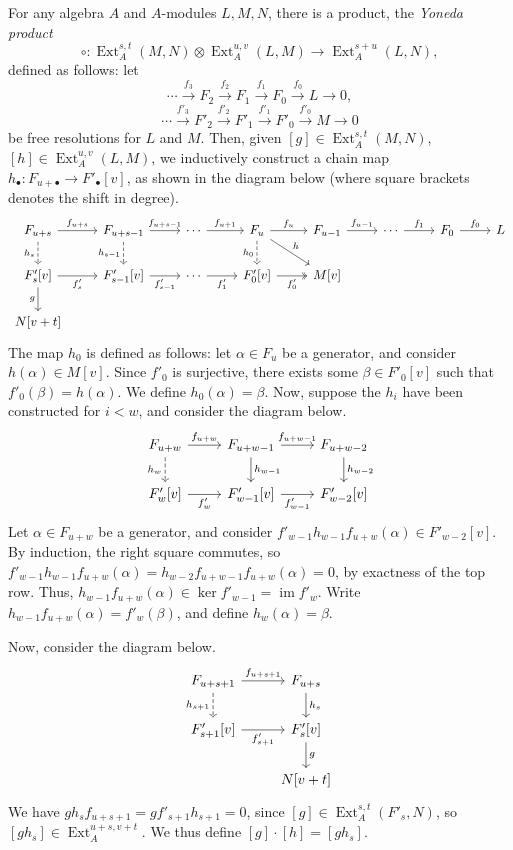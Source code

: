 \documentclass{MetricNotes2023}
\DeclareMathOperator{\Ext}{Ext}
\DeclareMathOperator{\im}{im}
\begin{document}
\begin{definition}
For any algebra \(A\) and \(A\)-modules \(L,M,N\), there is a product, the \textit{Yoneda product}
\[\circ : \Ext_A^{s,t}(M,N)\otimes \Ext^{u,v}_A(L,M)\to \Ext_A^{s+u}(L,N),\]
defined as follows: let 
\[\cdots \xrightarrow{f_3} F_2 \xrightarrow{f_2} F_1 \xrightarrow{f_1} F_0 \xrightarrow{f_0} L\to 0,\]
\[\cdots \xrightarrow{f'_3} F'_2 \xrightarrow{f'_2} F'_1 \xrightarrow{f'_1} F'_0 \xrightarrow{f'_0} M\to 0\]
be free resolutions for \(L\) and \(M\). Then, given \([g] \in \Ext_A^{s,t}(M, N)\), \([h]\in \Ext_A^{u,v}(L, M)\), we inductively construct a chain map \(h_\bullet : F_{u+\bullet} \to F'_{\bullet}[v]\), as shown in the diagram below (where square brackets denotes the shift in  degree).
\[\begin{tikzcd} 
F_{u+s} \arrow[r, "f_{u+s}"] \arrow[d, swap, "h_s", dashrightarrow]  & F_{u+s-1} \arrow[r, "f_{u+s-1}"] \arrow[d, "h_{s-1}"', dashrightarrow] & \cdots \arrow[r, "f_{u+1}"] & F_u \arrow[d, "h_0"', dashrightarrow] \arrow[dr, "h"] \arrow[r, "f_u"] & F_{u-1} \arrow[r, "f_{u-1}"] & \cdots \arrow[r, "f_1"] & F_0 \arrow[r, "f_0"] & L \\ 
F'_{s}[v] \arrow[r, swap, "f'_s"] \arrow[d, swap, "g"] & F'_{s-1}[v] \arrow[r, "f'_{s-1}"'] & \cdots \arrow[r, "f'_1"'] & F'_0[v] \arrow[r, "f'_0"', twoheadrightarrow] & M[v] & & & \\ 
N[v+t] & & & & & & & 
\end{tikzcd}\]
The map \(h_0\) is defined as follows: let \(\alpha \in F_u\) be a generator, and consider \(h(\alpha)\in M[v]\). Since \(f'_0\) is surjective, there exists some \(\beta\in F'_0[v]\) such that \(f'_0(\beta)=h(\alpha)\). We define \(h_0(\alpha)=\beta\). Now, suppose the \(h_i\) have been constructed for \(i<w\), and consider the diagram below.
\[\begin{tikzcd}
F_{u+w} \arrow[r, "f_{u+w}"] \arrow[d, swap, "h_w", dashrightarrow]  & F_{u+w-1} \arrow[r, "f_{u+w-1}"] \arrow[d, "h_{w-1}"] & F_{u+w-2} \arrow[d, "h_{w-2}"] \\ 
F'_w[v] \arrow[r, swap, "f'_w"]  & F'_{w-1}[v] \arrow[r, "f'_{w-1}"'] & F'_{w-2}[v] 
 \end{tikzcd}\] 
Let \(\alpha\in F_{u+w}\) be a generator, and consider \(f'_{w-1}h_{w-1}f_{u+w}(\alpha)\in F'_{w-2}[v]\). By induction, the right square commutes, so \(f'_{w-1}h_{w-1}f_{u+w}(\alpha)=h_{w-2}f_{u+w-1}f_{u+w}(\alpha)=0\), by exactness of the top row. Thus, \(h_{w-1}f_{u+w}(\alpha)\in \ker f'_{w-1}=\im f'_w\). Write \(h_{w-1}f_{u+w}(\alpha)=f'_w(\beta)\), and define \(h_w(\alpha)=\beta\).  

Now, consider the diagram below.
\[\begin{tikzcd}
F_{u+s+1} \arrow[r, "f_{u+s+1}"] \arrow[d, swap, "h_{s+1}", dashrightarrow]  & F_{u+s} \arrow[d, "h_{s}"]  \\
F'_{s+1}[v] \arrow[r, swap, "f'_{s+1}"]  & F'_{s}[v] \arrow[d, "g"]\\
& N[v+t]
\end{tikzcd}\]
We have \(gh_sf_{u+s+1}=gf'_{s+1}h_{s+1}=0\), since \([g] \in \Ext_A^{s,t}(F'_s, N)\), so \([gh_s]\in \Ext_A^{u+s, v+t}\). We thus define \([g]\cdot  [h]=[gh_s]\). 
\end{definition}
\end{document}
